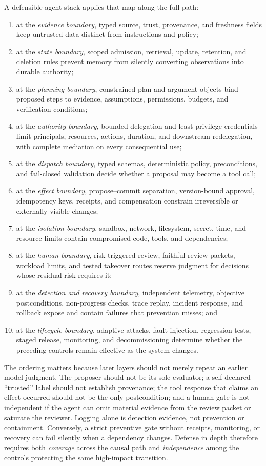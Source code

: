 A defensible agent stack applies that map along the full path:
\begin{enumerate}
    \item at the \emph{evidence boundary}, typed source, trust, provenance, and freshness fields keep untrusted data distinct from instructions and policy;
    \item at the \emph{state boundary}, scoped admission, retrieval, update, retention, and deletion rules prevent memory from silently converting observations into durable authority;
    \item at the \emph{planning boundary}, constrained plan and argument objects bind proposed steps to evidence, assumptions, permissions, budgets, and verification conditions;
    \item at the \emph{authority boundary}, bounded delegation and least privilege credentials limit principals, resources, actions, duration, and downstream redelegation, with complete mediation on every consequential use;
    \item at the \emph{dispatch boundary}, typed schemas, deterministic policy, preconditions, and fail-closed validation decide whether a proposal may become a tool call;
    \item at the \emph{effect boundary}, propose--commit separation, version-bound approval, idempotency keys, receipts, and compensation constrain irreversible or externally visible changes;
    \item at the \emph{isolation boundary}, sandbox, network, filesystem, secret, time, and resource limits contain compromised code, tools, and dependencies;
    \item at the \emph{human boundary}, risk-triggered review, faithful review packets, workload limits, and tested takeover routes reserve judgment for decisions whose residual risk requires it;
    \item at the \emph{detection and recovery boundary}, independent telemetry, objective postconditions, non-progress checks, trace replay, incident response, and rollback expose and contain failures that prevention misses; and
    \item at the \emph{lifecycle boundary}, adaptive attacks, fault injection, regression tests, staged release, monitoring, and decommissioning determine whether the preceding controls remain effective as the system changes.
\end{enumerate}

The ordering matters because later layers should not merely repeat an earlier model judgment. The proposer should not be its sole evaluator; a self-declared ``trusted'' label should not establish provenance; the tool response that claims an effect occurred should not be the only postcondition; and a human gate is not independent if the agent can omit material evidence from the review packet or saturate the reviewer. Logging alone is detection evidence, not prevention or containment. Conversely, a strict preventive gate without receipts, monitoring, or recovery can fail silently when a dependency changes. Defense in depth therefore requires both \emph{coverage} across the causal path and \emph{independence} among the controls protecting the same high-impact transition.

